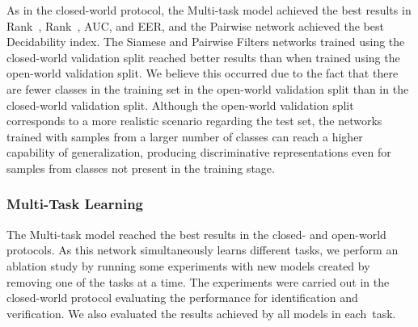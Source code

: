 As in the closed-world protocol, the Multi-task model achieved the best results in Rank~, Rank~, AUC, and EER, and the Pairwise network achieved the best Decidability index.
The Siamese and Pairwise Filters networks trained using the closed-world validation split reached better results than when trained using the open-world validation split.
We believe this occurred due to the fact that there are fewer classes in the training set in the open-world validation split than in the closed-world validation split.
Although the open-world validation split corresponds to a more realistic scenario regarding the test set, the networks trained with samples from a larger number of classes can reach a higher capability of generalization, producing discriminative representations even for samples from classes not present in the training stage.

\subsubsection{Multi-Task Learning}
\label{sec:multi}

The Multi-task model reached the best results in the closed- and open-world protocols.
As this network simultaneously learns different tasks, we perform an ablation study by running some experiments with  new models created by removing one of the tasks at a time.
The experiments were carried out in the closed-world protocol evaluating the performance for identification and verification.
We also evaluated the results achieved by all models in each~task.

\begin{table*}[!ht]
\centering
\caption{Results (\%) from several Multi-task models trained to predict different tasks. The device model concerns the task of identifying the smartphone model with which the image was taken. The age, gender, and eye side regard the tasks of classifying the input image into age ranges, gender (male or female), and eye side (left or right), respectively.}
\label{tab:multitask}

\vspace{-2mm}
\end{table*}


